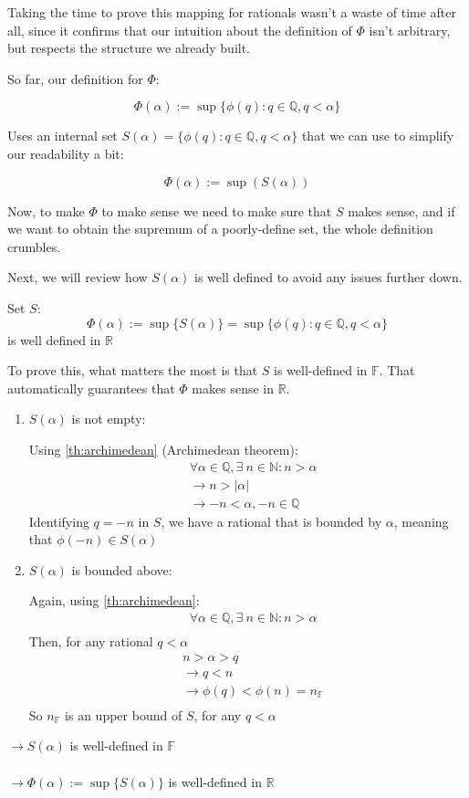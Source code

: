 Taking the time to prove this mapping for rationals wasn't a waste of time after all, since it confirms that our intuition about the definition of $\Phi$ isn't arbitrary, but respects the structure we already built.


So far, our definition for $\Phi$:

$$\Phi(\alpha) := \sup\{\phi(q): q \in \mathbb{Q}, q < \alpha \}$$

Uses an internal set $S(\alpha) = \{\phi(q): q \in \mathbb{Q}, q < \alpha \}$ that we can use to simplify our readability a bit:

$$\Phi(\alpha) := \sup(S(\alpha))$$

Now, to make $\Phi$ to make sense we need to make sure that $S$ makes sense, and if we want to obtain the supremum of a poorly-define set, the whole definition crumbles.

Next, we will review how $S(\alpha)$ is well defined to avoid any issues further down.

\begin{lemma}
Set $S$:
$$\Phi(\alpha) := \sup\{S(\alpha)\} = \sup\{\phi(q): q \in \mathbb{Q}, q < \alpha \}$$ is well defined in $\mathbb{R}$
\end{lemma}

\begin{bookproof}
To prove this, what matters the most is that $S$ is well-defined in $\mathbb{F}$. That automatically guarantees that $\Phi$ makes sense in $\mathbb{R}$.
\begin{enumerate}
\item $S(\alpha)$ is not empty:

Using \cref{th:archimedean} (Archimedean theorem):
\begin{align*}
&\forall \alpha \in \mathbb{Q}, \exists \ n \in \mathbb{N}: n > \alpha \\
&\rightarrow n > |\alpha| \\
&\rightarrow -n < \alpha, -n \in \mathbb{Q}
\end{align*}
Identifying $q = -n$ in $S$, we have a rational that is bounded by $\alpha$, meaning that $\phi(-n) \in S(\alpha)$
\\
\item $S(\alpha)$ is bounded above:

Again, using \cref{th:archimedean}:
\begin{align*}
&\forall \alpha \in \mathbb{Q}, \exists \ n \in \mathbb{N}: n > \alpha \\
\end{align*}
Then, for any rational $q < \alpha$
\begin{align*}
& n > \alpha > q \\
& \rightarrow q < n \\
& \rightarrow \phi(q) < \phi(n) = n_\mathbb{F}\\
\end{align*}
So $n_\mathbb{F}$ is an upper bound of $S$, for any $q < \alpha$
\end{enumerate}
$\rightarrow S(\alpha)$ is well-defined in $\mathbb{F}$ \\\\
$\rightarrow \Phi(\alpha) := \sup\{S(\alpha)\}$ is well-defined in $\mathbb{R}$
\end{bookproof}

